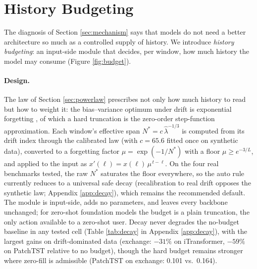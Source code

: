 \section{History Budgeting}
\label{sec:method}

The diagnosis of Section \ref{sec:mechanism} says that models do not need a better architecture so much as a controlled supply of history. We introduce \emph{history budgeting}: an input-side module that decides, per window, how much history the model may consume (Figure \ref{fig:budget}).

\paragraph{Design.}
The law of Section \ref{sec:powerlaw} prescribes not only how much history to read but how to weight it: the bias--variance optimum under drift is exponential forgetting \citep{ljung1983}, of which a hard truncation is the zero-order step-function approximation. Each window's effective span $N^* = c\,\hat{\lambda}^{-1/3}$ is computed from its drift index through the calibrated law (with $c{=}65.6$ fitted once on synthetic data), converted to a forgetting factor $\mu = \exp(-1/N^*)$ with a floor $\mu \ge e^{-3/L}$, and applied to the input as $x'(\ell) = x(\ell)\,\mu^{\,t-\ell}$. On the four real benchmarks tested, the raw $N^*$ saturates the floor everywhere, so the auto rule currently reduces to a universal safe decay (recalibration to real drift opposes the synthetic law; Appendix \ref{app:decay}), which remains the recommended default. The module is input-side, adds no parameters, and leaves every backbone unchanged; for zero-shot foundation models the budget is a plain truncation, the only action available to a zero-shot user. Decay never degrades the no-budget baseline in any tested cell (Table \ref{tab:decay} in Appendix \ref{app:decay}), with the largest gains on drift-dominated data (exchange: $-31\%$ on iTransformer, $-59\%$ on PatchTST relative to no budget), though the hard budget remains stronger where zero-fill is admissible (PatchTST on exchange: 0.101 vs.\ 0.164).



